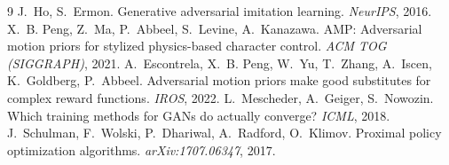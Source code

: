 \begin{thebibliography}{9}
 J.~Ho, S.~Ermon. Generative adversarial imitation learning.
  \emph{NeurIPS}, 2016.
 X.~B. Peng, Z.~Ma, P.~Abbeel, S.~Levine, A.~Kanazawa.
  AMP: Adversarial motion priors for stylized physics-based character control.
  \emph{ACM TOG (SIGGRAPH)}, 2021.
 A.~Escontrela, X.~B. Peng, W.~Yu, T.~Zhang, A.~Iscen,
  K.~Goldberg, P.~Abbeel. Adversarial motion priors make good substitutes for
  complex reward functions. \emph{IROS}, 2022.
 L.~Mescheder, A.~Geiger, S.~Nowozin. Which training
  methods for GANs do actually converge? \emph{ICML}, 2018.
 J.~Schulman, F.~Wolski, P.~Dhariwal, A.~Radford,
  O.~Klimov. Proximal policy optimization algorithms. \emph{arXiv:1707.06347}, 2017.
\end{thebibliography}


